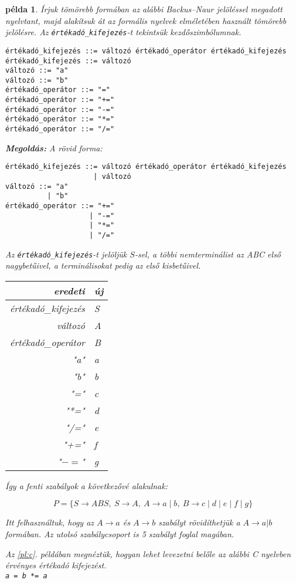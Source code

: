 \documentclass[a4paper]{article}
\newtheorem{pelda}{példa}[section]
\begin{document}
\begin{pelda}
Írjuk tömörebb formában az alábbi Backus--Naur jelöléssel megadott nyelvtant,
majd alakítsuk át az formális nyelvek elméletében használt tömörebb
jelölésre. Az \verb+értékadó_kifejezés+-t tekintsük kezdőszimbólumnak.
\vspace{1ex}
\begin{verbatim}
értékadó_kifejezés ::= változó értékadó_operátor értékadó_kifejezés
értékadó_kifejezés ::= változó
változó ::= "a"
változó ::= "b"
értékadó_operátor ::= "="
értékadó_operátor ::= "+="
értékadó_operátor ::= "-="
értékadó_operátor ::= "*="
értékadó_operátor ::= "/="
\end{verbatim}


\textbf{Megoldás:}
A rövid forma:

\vspace{1ex}
\begin{verbatim}
értékadó_kifejezés ::= változó értékadó_operátor értékadó_kifejezés
                     | változó
változó ::= "a"
          | "b"
értékadó_operátor ::= "+="
                    | "-="
                    | "*="
                    | "/="
\end{verbatim}
\vspace{1ex}

Az \verb+értékadó_kifejezés+-t jelöljük $S$-sel, a többi nemterminálist az
ABC első nagybetűivel, a terminálisokat pedig az első kisbetűivel.

{\it
\begin{tabular}{|r|l|}
\hline
eredeti & új\\
\hline
értékadó\_kifejezés& S\\
változó&A\\
értékadó\_operátor&B\\
"a"&a\\
"b"&b\\
"="& c\\
"*="& d\\
"/="& e\\
"+="& f\\
"$-=$"& g\\
\hline
\end{tabular}
}

Így a fenti szabályok a következővé alakulnak:

\[P=\{ S \to ABS,\: S\to A,\: A\to a \mid b,\: B\to c \mid d \mid e \mid
f \mid g \}\]

Itt felhasználtuk, hogy az $A\to a$ és $A\to b$ szabályt rövidíthetjük a
$A\to a|b$ formában. Az utolsó szabálycsoport is 5 szabályt foglal
magában.

Az \ref{pl:c}.  példában megnéztük, hogyan lehet levezetni belőle az
alábbi C nyelvben érvényes értékadó kifejezést.\\
\verb!a = b *= a!
\end{pelda}
\end{document}
